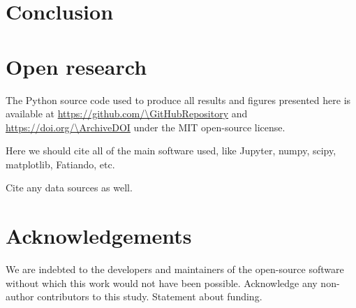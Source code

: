 
\lipsum[5-10]


\section{Conclusion}

\lipsum[1-5]


\section{Open research}

The Python source code used to produce all results and figures presented here
is available at \url{https://github.com/\GitHubRepository} and
\url{https://doi.org/\ArchiveDOI} under the MIT open-source license.

Here we should cite all of the main software used, like Jupyter, numpy, scipy,
matplotlib, Fatiando, etc.

Cite any data sources as well.



\section{Acknowledgements}

We are indebted to the developers and maintainers of the open-source software
without which this work would not have been possible.
Acknowledge any non-author contributors to this study.
Statement about funding.

